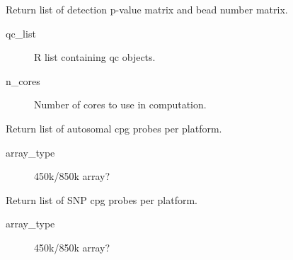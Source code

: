 \documentclass[letterpaper,10pt,english]{sphinxmanual}
\begin{document}

\begin{fulllineitems}
\label{\detokenize{index:pymethylprocess.meffil_functions.load_detection_p_values_beadnum}}
Return list of detection p-value matrix and bead number matrix.
\begin{description}
\item[{qc\_list}] \leavevmode
R list containing qc objects.

\item[{n\_cores}] \leavevmode
Number of cores to use in computation.

\end{description}

\end{fulllineitems}


\begin{fulllineitems}
\label{\detokenize{index:pymethylprocess.meffil_functions.r_autosomal_cpgs}}
Return list of autosomal cpg probes per platform.
\begin{description}
\item[{array\_type}] \leavevmode
450k/850k array?

\end{description}

\end{fulllineitems}


\begin{fulllineitems}
\label{\detokenize{index:pymethylprocess.meffil_functions.r_snp_cpgs}}
Return list of SNP cpg probes per platform.
\begin{description}
\item[{array\_type}] \leavevmode
450k/850k array?

\end{description}

\end{fulllineitems}
\end{document}
